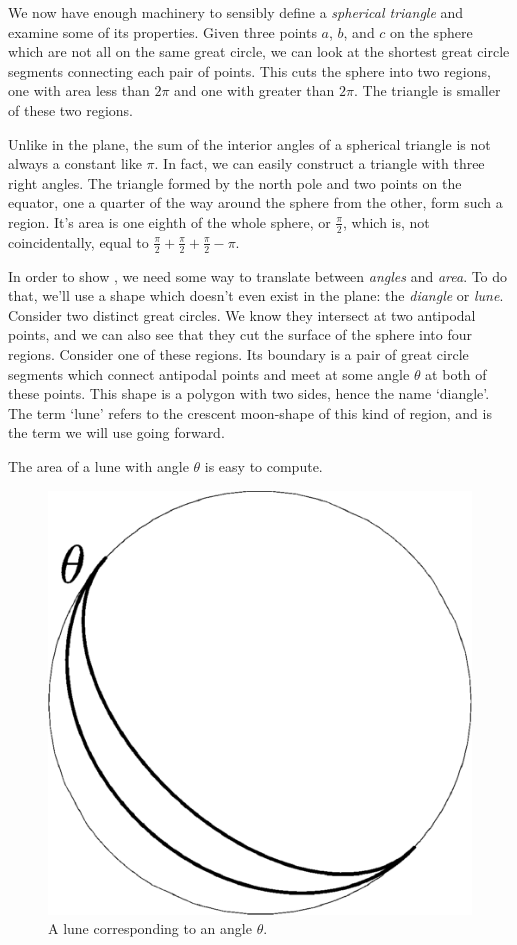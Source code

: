 We now have enough machinery to sensibly define a \textit{spherical triangle} and examine some of its properties. Given three points $a$, $b$, and $c$ on the sphere which are not all on the same great circle, we can look at the shortest great circle segments connecting each pair of points.  This cuts the sphere into two regions, one with area less than $2\pi$ and one with greater than $2\pi$.  The triangle is smaller of these two regions.


Unlike in the plane, the sum of the interior angles of a spherical triangle is not always a constant like $\pi$.  In fact, we can easily construct a triangle with three right angles.  The triangle formed by the north pole and two points on the equator, one a quarter of the way around the sphere from the other, form such a region.  It's area is one eighth of the whole sphere, or $\tfrac{\pi}{2}$, which is, not coincidentally, equal to $\tfrac{\pi}{2}+\tfrac{\pi}{2}+\tfrac{\pi}{2} - \pi$.





In order to  show , we need some way to translate between \textit{angles} and \textit{area}.  To do that, we'll use a shape which doesn't even exist in the plane: the \textit{diangle} or \textit{lune}.  Consider two distinct great circles.  We know they intersect at two antipodal points, and we can also see that they cut the surface of the sphere into four regions.  Consider one of these regions.  Its boundary is a pair of great circle segments which connect antipodal points and meet at some angle $\theta$ at both of these points.  This shape is a polygon with two sides, hence the name `diangle'.  The term `lune' refers to the crescent moon-shape of this kind of region, and is the term we will use going forward.  

The area of a lune with angle $\theta$ is easy to compute.


\begin{figure}[htb]
	\centering
	\includegraphics[width=.35\textwidth]{figs/lune.pdf}
	\caption{A lune corresponding to an angle $\theta$. }
	\label{fig:lune}
\end{figure}

